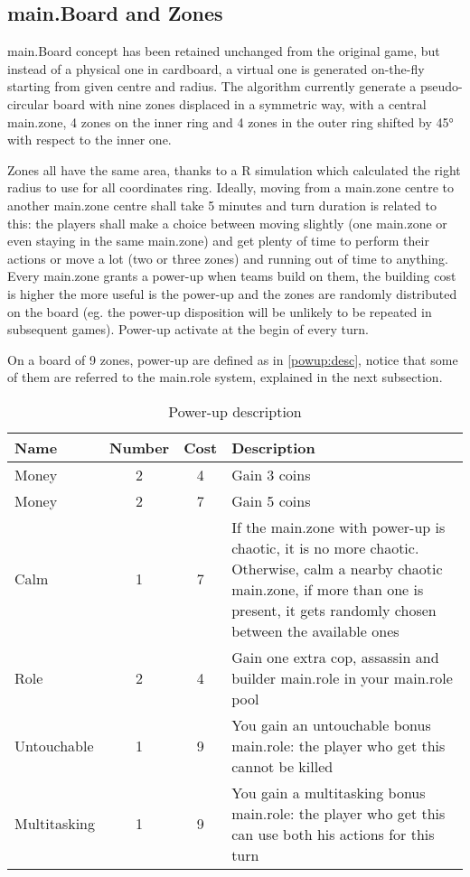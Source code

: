 		\subsection{main.Board and Zones}
		
			main.Board concept has been retained unchanged from the original game, but instead of a physical one in cardboard, a virtual one is generated on-the-fly starting from given centre and radius.
			The algorithm currently generate a pseudo-circular board with nine zones displaced in a symmetric way, with a central main.zone, 4 zones on the inner ring and 4 zones in the outer ring shifted by 45° with respect to the inner one.
			
			
			Zones all have the same area, thanks to a R simulation which calculated the right radius to use for all coordinates ring.
			Ideally, moving from a main.zone centre to another main.zone centre shall take 5 minutes and turn duration is related to this: the players shall make a choice between moving slightly (one main.zone or even staying in the same main.zone) and get plenty of time to perform their actions or move a lot (two or three zones) and running out of time to anything.
			Every main.zone grants a power-up when teams build on them, the building cost is higher the more useful is the power-up and the zones are randomly distributed on the board (eg. the power-up disposition will be unlikely to be repeated in subsequent games).
			Power-up activate at the begin of every turn.
			
			On a board of 9 zones, power-up are defined as in \autoref{powup:desc}, notice that some of them are referred to the main.role system, explained in the next subsection.
			
			\begin{table}
				\caption{Power-up description}
				\label{powup:desc}
				\centering
				\begin{tabular}{lccp{}}
					\toprule
					Name 			& Number 	& Cost 	& Description \\
					\midrule
					Money 			& 2 		& 4 	& Gain 3 coins \\
					Money 			& 2 		& 7 	& Gain 5 coins \\
					Calm 			& 1 		& 7 	& If the main.zone with power-up is chaotic, it is no more chaotic. Otherwise, calm a nearby chaotic main.zone, if more than one is present, it gets randomly chosen between the available ones \\
					Role 			& 2 		& 4 	& Gain one extra cop, assassin and builder main.role in your main.role pool \\
					Untouchable 	& 1 		& 9 	& You gain an untouchable bonus main.role: the player who get this cannot be killed \\
					Multitasking 	& 1 		& 9 	& You gain a multitasking bonus main.role: the player who get this can use both his actions for this turn \\
					\bottomrule
				\end{tabular}
			\end{table}
		
